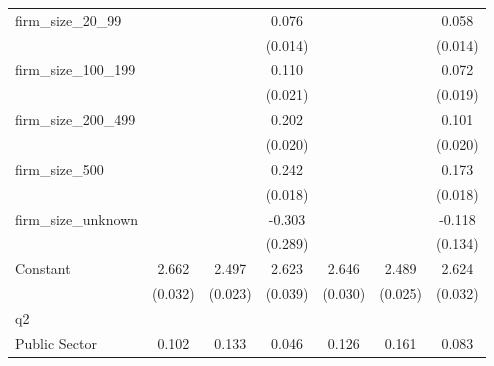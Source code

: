 {\begin{tabular}{l*{6}{c}}
firm\_size\_20\_99     &                     &                     &       0.076\sym{***}&                     &                     &       0.058\sym{***}\\
                    &                     &                     &     (0.014)         &                     &                     &     (0.014)         \\
firm\_size\_100\_199   &                     &                     &       0.110\sym{***}&                     &                     &       0.072\sym{***}\\
                    &                     &                     &     (0.021)         &                     &                     &     (0.019)         \\
firm\_size\_200\_499   &                     &                     &       0.202\sym{***}&                     &                     &       0.101\sym{***}\\
                    &                     &                     &     (0.020)         &                     &                     &     (0.020)         \\
firm\_size\_500       &                     &                     &       0.242\sym{***}&                     &                     &       0.173\sym{***}\\
                    &                     &                     &     (0.018)         &                     &                     &     (0.018)         \\
firm\_size\_unknown   &                     &                     &      -0.303         &                     &                     &      -0.118         \\
                    &                     &                     &     (0.289)         &                     &                     &     (0.134)         \\
Constant            &       2.662\sym{***}&       2.497\sym{***}&       2.623\sym{***}&       2.646\sym{***}&       2.489\sym{***}&       2.624\sym{***}\\
                    &     (0.032)         &     (0.023)         &     (0.039)         &     (0.030)         &     (0.025)         &     (0.032)         \\
\hline
q2                  &                     &                     &                     &                     &                     &                     \\
Public Sector       &       0.102\sym{***}&       0.133\sym{***}&       0.046\sym{***}&       0.126\sym{***}&       0.161\sym{***}&       0.083\sym{***}\\

\end{tabular}}
